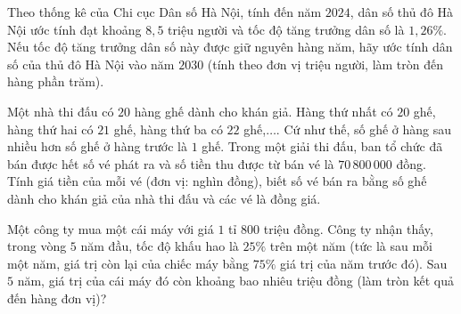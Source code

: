 \begin{ex}%
	Theo thống kê của Chi cục Dân số Hà Nội, tính đến năm $2024$, dân số thủ đô Hà Nội ước tính đạt khoảng $8{,}5$ triệu người và tốc độ tăng trưởng dân số là $1{,}26\%$. Nếu tốc độ tăng trưởng dân số này được giữ nguyên hàng năm, hãy ước tính dân số của thủ đô Hà Nội vào năm $2030$ (tính theo đơn vị triệu người, làm tròn đến hàng phần trăm).
\end{ex}

\begin{ex}%
	Một nhà thi đấu có $20$ hàng ghế dành cho khán giả. Hàng thứ nhất có $20$ ghế, hàng thứ hai có $21$ ghế, hàng thứ ba có $22$ ghế,$\ldots$. Cứ như thế, số ghế ở hàng sau nhiều hơn số ghế ở hàng trước là $1$ ghế. Trong một giải thi đấu, ban tổ chức đã bán được hết số vé phát ra và số tiền thu được từ bán vé là $70\,800\,000$ đồng. Tính giá tiền của mỗi vé (đơn vị: nghìn đồng), biết số vé bán ra bằng số ghế dành cho khán giả của nhà thi đấu và các vé là đồng giá.
\end{ex}

\begin{ex}%
	Một công ty mua một cái máy với giá $1$ tỉ $800$ triệu đồng. Công ty nhận thấy, trong vòng $5$ năm đầu, tốc độ khấu hao là $25\%$ trên một năm (tức là sau mỗi một năm, giá trị còn lại của chiếc máy bằng $75\%$ giá trị của năm trước đó). Sau $5$ năm, giá trị của cái máy đó còn khoảng bao nhiêu triệu đồng (làm tròn kết quả đến hàng đơn vị)?
\end{ex}

